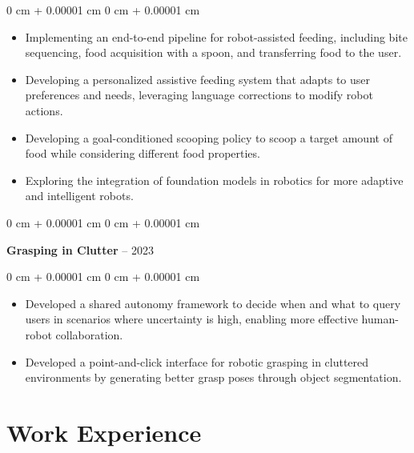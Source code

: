 \documentclass[10pt, letterpaper]{article}
\newenvironment{highlights}{
    \begin{itemize}[
        topsep=0.10 cm,
        parsep=0.10 cm,
        partopsep=0pt,
        itemsep=0pt,
        leftmargin=0 cm + 10pt
    ]
}{
    \end{itemize}
} %
\newenvironment{onecolentry}{
    \begin{adjustwidth}{
        0 cm + 0.00001 cm
    }{
        0 cm + 0.00001 cm
    }
}{
    \end{adjustwidth}
} %
\newenvironment{twocolentry}[2][]{
    \onecolentry
    \def\secondColumn{#2}
    \setcolumnwidth{\fill, 4.5 cm}
    \begin{paracol}{2}
}{
    \switchcolumn \raggedleft \secondColumn
    \end{paracol}
    \endonecolentry
} %
\begin{document}
        \vspace{0.10 cm}
        \begin{onecolentry}
            \begin{highlights}
                \item Implementing an end-to-end pipeline for robot-assisted feeding, including bite sequencing, food acquisition with a spoon, and transferring food to the user.
                \item Developing a personalized assistive feeding system that adapts to user preferences and needs, leveraging language corrections to modify robot actions.
                \item Developing a goal-conditioned scooping policy to scoop a target amount of food while considering different food properties.
                \item Exploring the integration of foundation models in robotics for more adaptive and intelligent robots.
            \end{highlights}
        \end{onecolentry}


        \vspace{0.2 cm}

        \begin{twocolentry}{
            2020 -- 2023
        }
            \textbf{Grasping in Clutter}\end{twocolentry}

        \vspace{0.10 cm}
        \begin{onecolentry}
            \begin{highlights}
                \item Developed a shared autonomy framework to decide when and what to query users in scenarios where uncertainty is high, enabling more effective human-robot collaboration.
                \item Developed a point-and-click interface for robotic grasping in cluttered environments by generating better grasp poses through object segmentation.
            \end{highlights}
        \end{onecolentry}



    
    \section{Work Experience}
\end{document}
